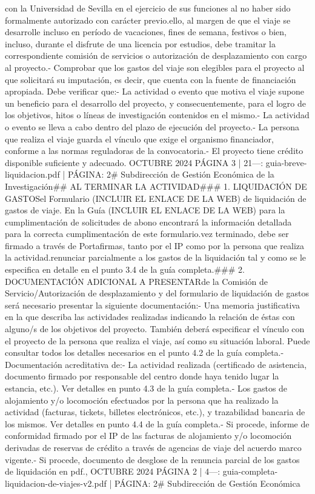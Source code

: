 \documentclass{article}
\begin{document}
\begin{itemize}
con la Universidad de Sevilla en el ejercicio de sus funciones al no haber sido formalmente autorizado con carácter previo.\n\nPor ello, al margen de que el viaje se desarrolle incluso en período de vacaciones, fines de semana, festivos o bien, incluso, durante el disfrute de una licencia por estudios, debe tramitar la correspondiente comisión de servicios o autorización de desplazamiento con cargo al proyecto.\n\n- Comprobar que los gastos del viaje son elegibles para el proyecto al que solicitará su imputación, es decir, que cuenta con la fuente de financiación apropiada. Debe verificar que:\n- La actividad o evento que motiva el viaje supone un beneficio para el desarrollo del proyecto, y consecuentemente, para el logro de los objetivos, hitos o líneas de investigación contenidos en el mismo.\n- La actividad o evento se lleva a cabo dentro del plazo de ejecución del proyecto.\n- La persona que realiza el viaje guarda el vínculo que exige el organismo financiador, conforme a las normas reguladoras de la convocatoria.\n- El proyecto tiene crédito disponible suficiente y adecuado.\n{} OCTUBRE 2024    PÁGINA 3 | 21\n\n---\n\nFUENTE: guia-breve-liquidacion.pdf | PÁGINA: 2\n# Subdirección de Gestión Económica de la Investigación\n\n## AL TERMINAR LA ACTIVIDAD\n\n### 1. LIQUIDACIÓN DE GASTOS\n\nRellene el Formulario (INCLUIR EL ENLACE DE LA WEB) de liquidación de gastos de viaje. En la Guía (INCLUIR EL ENLACE DE LA WEB) para la cumplimentación de solicitudes de abono encontrará la información detallada para la correcta cumplimentación de este formulario.\n\nUna vez terminado, debe ser firmado a través de Portafirmas, tanto por el IP como por la persona que realiza la actividad.\n{} renunciar parcialmente a los gastos de la liquidación tal y como se le especifica en detalle en el punto 3.4 de la guía completa.\n\n### 2. DOCUMENTACIÓN ADICIONAL A PRESENTAR\n{} de la Comisión de Servicio/Autorización de desplazamiento y del formulario de liquidación de gastos será necesario presentar la siguiente documentación:\n\n- Una memoria justificativa en la que describa las actividades realizadas indicando la relación de éstas con alguno/s de los objetivos del proyecto. También deberá especificar el vínculo con el proyecto de la persona que realiza el viaje, así como su situación laboral. Puede consultar todos los detalles necesarios en el punto 4.2 de la guía completa.\n\n- Documentación acreditativa de:\n- La actividad realizada (certificado de asistencia, documento firmado por responsable del centro donde haya tenido lugar la estancia, etc.). Ver detalles en punto 4.3 de la guía completa.\n- Los gastos de alojamiento y/o locomoción efectuados por la persona que ha realizado la actividad (facturas, tickets, billetes electrónicos, etc.), y trazabilidad bancaria de los mismos. Ver detalles en punto 4.4 de la guía completa.\n- Si procede, informe de conformidad firmado por el IP de las facturas de alojamiento y/o locomoción derivadas de reservas de crédito a través de agencias de viaje del acuerdo marco vigente.\n- Si procede, documento de desglose de la renuncia parcial de los gastos de liquidación en pdf.\n{}, OCTUBRE 2024    PÁGINA 2 | 4\n\n---\n\nFUENTE: guia-completa-liquidacion-de-viajes-v2.pdf | PÁGINA: 2\n# Subdirección de Gestión Económica 
\end{itemize}
\end{document}
